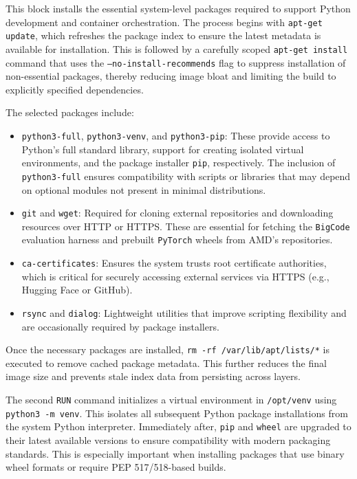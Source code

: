 This block installs the essential system-level packages required to support Python development and container orchestration. The process begins with \texttt{apt-get update}, which refreshes the package index to ensure the latest metadata is available for installation. This is followed by a carefully scoped \texttt{apt-get install} command that uses the \texttt{--no-install-recommends} flag to suppress installation of non-essential packages, thereby reducing image bloat and limiting the build to explicitly specified dependencies.

The selected packages include:

\begin{itemize}
	\item \texttt{python3-full}, \texttt{python3-venv}, and \texttt{python3-pip}: These provide access to Python's full standard library, support for creating isolated virtual environments, and the package installer \texttt{pip}, respectively. The inclusion of \texttt{python3-full} ensures compatibility with scripts or libraries that may depend on optional modules not present in minimal distributions.
	\item \texttt{git} and \texttt{wget}: Required for cloning external repositories and downloading resources over HTTP or HTTPS. These are essential for fetching the \texttt{BigCode} evaluation harness and prebuilt \texttt{PyTorch} wheels from AMD's repositories.
	\item \texttt{ca-certificates}: Ensures the system trusts root certificate authorities, which is critical for securely accessing external services via HTTPS (e.g., Hugging Face or GitHub).
	\item \texttt{rsync} and \texttt{dialog}: Lightweight utilities that improve scripting flexibility and are occasionally required by package installers.
\end{itemize}

Once the necessary packages are installed, \texttt{rm -rf /var/lib/apt/lists/*} is executed to remove cached package metadata. This further reduces the final image size and prevents stale index data from persisting across layers.

The second \texttt{RUN} command initializes a virtual environment in \texttt{/opt/venv} using \texttt{python3 -m venv}. This isolates all subsequent Python package installations from the system Python interpreter. Immediately after, \texttt{pip} and \texttt{wheel} are upgraded to their latest available versions to ensure compatibility with modern packaging standards. This is especially important when installing packages that use binary wheel formats or require PEP 517/518-based builds.

